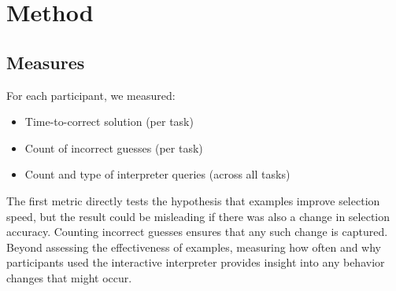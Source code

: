 \section{Method}




\subsection{Measures}
For each participant, we measured:
\begin{itemize}
    \item Time-to-correct solution (per task)
    \item Count of incorrect guesses (per task)
    \item Count and type of interpreter queries (across all tasks)
\end{itemize}

The first metric directly tests the hypothesis that examples improve
selection speed, but the result could be misleading if there was also a
change in selection accuracy.
%
Counting incorrect guesses ensures that any such change is captured.
%
Beyond assessing the effectiveness of examples, measuring how often and why
participants used the interactive interpreter provides insight into any
behavior changes that might occur.

